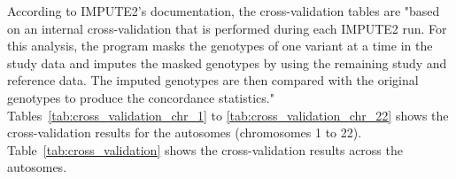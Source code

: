
According to IMPUTE2's documentation, the cross-validation tables are "based on
an internal cross-validation that is performed during each IMPUTE2 run. For
this analysis, the program masks the genotypes of one variant at a time in the
study data and imputes the masked genotypes by using the remaining study and
reference data. The imputed genotypes are then compared with the original
genotypes to produce the concordance statistics."\\

Tables~\ref{tab:cross_validation_chr_1} to \ref{tab:cross_validation_chr_22}
shows the cross-validation results for the autosomes (chromosomes 1 to 22).
Table~\ref{tab:cross_validation} shows the cross-validation results across the
autosomes.


